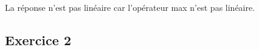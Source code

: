 \documentclass[12pt]{article}
\begin{document}
\begin{enumerate}
La réponse n'est pas linéaire car l'opérateur max n'est pas linéaire.
\end{enumerate}
\subsection*{Exercice 2}
\end{document}
